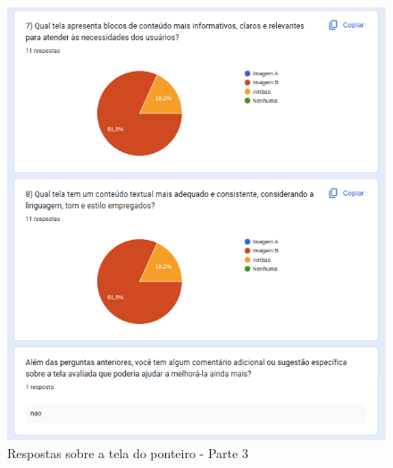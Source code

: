 \begin{figure}[!h]
	\begin{center}
	    \includegraphics[scale=0.7]{figs/Answers/Professionals/19.png}
	\end{center}
	\caption{\label{APC_TPon03}Respostas sobre a tela do ponteiro - Parte 3}
\end{figure}

\newpage